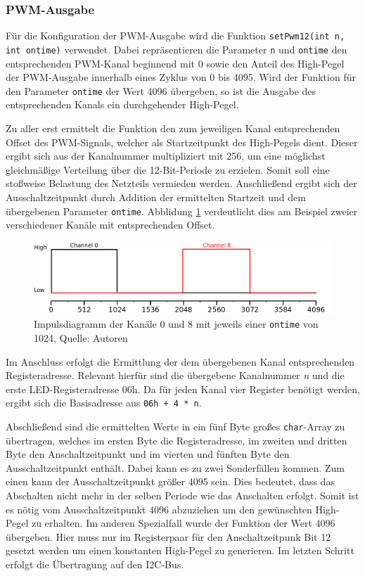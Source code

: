 \documentclass[a4paper,12pt]{scrartcl}
\begin{document}
\subsubsection{PWM-Ausgabe}
\label{sec:pwmOut}
Für die Konfiguration der PWM-Ausgabe wird die Funktion \texttt{setPwm12(int n, int ontime)} verwendet. Dabei repräsentieren die Parameter \texttt{n} und \texttt{ontime} den entsprechenden PWM-Kanal beginnend mit 0 sowie den Anteil des High-Pegel der PWM-Ausgabe innerhalb eines Zyklus von 0 bis 4095. Wird der Funktion für den Parameter \texttt{ontime} der Wert 4096 übergeben, so ist die Ausgabe des entsprechenden Kanals ein durchgehender High-Pegel.

Zu aller erst ermittelt die Funktion den zum jeweiligen Kanal entsprechenden Offset des PWM-Signals, welcher als Startzeitpunkt des High-Pegels dient. Dieser ergibt sich aus der Kanalnummer multipliziert mit 256, um eine möglichst gleichmäßige Verteilung über die 12-Bit-Periode zu erzielen. Somit soll eine stoßweise Belastung des Netzteils vermieden werden. Anschließend ergibt sich der Ausschaltzeitpunkt durch Addition der ermittelten Startzeit und dem übergebenen Parameter \texttt{ontime}. Abblidung \ref{fig:pwmExample2} verdeutlicht dies am Beispiel zweier verschiedener Kanäle mit entsprechenden Offset.

\begin{figure}[H]
\begin{center}
\includegraphics[width=0.9\hsize]{./schematics/pwmDiagram2.png}
\end{center}
\caption{\label{fig:pwmExample2}Impulsdiagramm der Kanäle 0 und 8 mit jeweils einer \texttt{ontime} von 1024, Quelle: Autoren}
\end{figure}

Im Anschluss erfolgt die Ermittlung der dem übergebenen Kanal entsprechenden Registeradresse. Relevant hierfür sind die übergebene Kanalnummer \textit{n} und die erste LED-Registeradresse 06h. Da für jeden Kanal vier Register benötigt werden, ergibt sich die Basisadresse aus \texttt{06h + 4 * n}.

Abschließend sind die ermittelten Werte in ein fünf Byte großes \texttt{char}-Array zu übertragen, welches im ersten Byte die Registeradresse, im zweiten und dritten Byte den Anschaltzeitpunkt und im vierten und fünften Byte den Ausschaltzeitpunkt enthält. Dabei kann es zu zwei Sonderfällen kommen. Zum einen kann der Ausschaltzeitpunkt größer 4095 sein. Dies bedeutet, dass das Abschalten nicht mehr in der selben Periode wie das Anschalten erfolgt. Somit ist es nötig vom Ausschaltzeitpunkt 4096 abzuziehen um den gewünschten High-Pegel zu erhalten. Im anderen Spezialfall wurde der Funktion der Wert 4096 übergeben. Hier muss nur im Registerpaar für den Anschaltzeitpunk Bit 12 gesetzt werden um einen konstanten High-Pegel zu generieren. Im letzten Schritt erfolgt die Übertragung auf den I2C-Bus.
\end{document}
